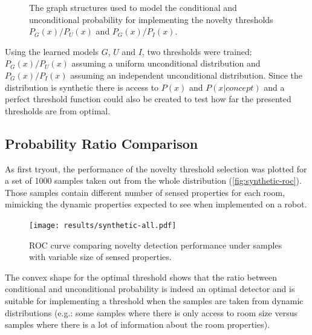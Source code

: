 \begin{figure}[h]
\centering

\qquad
{}
\qquad
{}

\caption{\label{fig:simple-experiment}The graph structures used to model the
         conditional and unconditional probability for implementing the novelty
         thresholds $P_G(x)/P_U(x)$ and $P_G(x)/P_I(x)$.}
\end{figure}

Using the learned models $G$, $U$ and $I$, two thresholds were trained:
$P_G(x)/P_U(x)$ assuming a uniform unconditional distribution
and $P_G(x)/P_I(x)$ assuming an independent unconditional distribution.
Since the distribution is synthetic there is access to $P(x)$ and $P(x|concept)$
and a perfect threshold function could also be created to test how far the
presented thresholds are from optimal.

\subsection{Probability Ratio Comparison}
As first tryout, the performance of the novelty threshold selection was plotted for a set
of 1000 samples taken out from the whole distribution (\autoref{fig:synthetic-roc}).
Those samples contain different number of sensed properties for each room, mimicking
the dynamic properties expected to see when implemented on a robot.

\begin{figure}[h]
\centering
\texttt{[image: results/synthetic-all.pdf]}

\caption{\label{fig:synthetic-roc}ROC curve comparing novelty detection performance
         under samples with variable size of sensed properties.}
\end{figure}

The convex shape for the optimal threshold shows that the ratio between conditional
and unconditional probability is indeed an optimal detector and is suitable for
implementing a threshold when the samples are taken from dynamic
distributions (e.g.: some samples where there is only access to room size versus
samples where there is a lot of information about the room properties).

